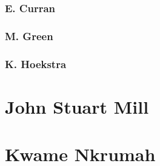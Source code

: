 \documentclass[12pt, letterpaper]{article}
\begin{document}
\subsubsection{E. Curran}



\subsubsection{M. Green}

\subsubsection{K. Hoekstra}

\newpage
\section{John Stuart Mill}


\newpage
\section{Kwame Nkrumah}
\end{document}
